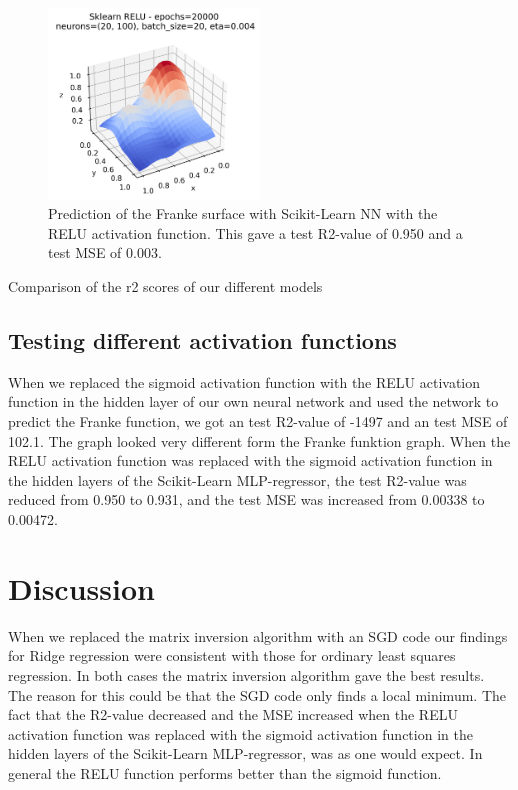 \documentclass[12pt,a4paper]{article}
\begin{document}
    \begin{figure}[H]
        \centering
        \includegraphics[width=0.5\textwidth]{figures/sklearn_relu.png}
        \caption{Prediction of the Franke surface with Scikit-Learn NN with the RELU activation function. This gave a test R2-value of 0.950 and a test MSE of 0.003.}
        \label{fig:nn_sklearn_surf3}
    \end{figure}
    
    \begin{table}[H]
        \centering
        \caption{Comparison of the r2 scores of our different models}
        \label{tab:ex2comapare}
    \end{table}


\subsection{Testing different activation functions}

When we replaced the sigmoid activation function with the RELU activation function in the hidden layer of our own neural network and used the network to predict the Franke function, we got an test R2-value of -1497 and an test MSE of 102.1. The graph looked very different form the Franke funktion graph. When the RELU activation function was replaced with the sigmoid activation function in the hidden layers of the Scikit-Learn MLP-regressor, the test R2-value was reduced from 0.950 to 0.931, and the test MSE was increased from 0.00338 to 0.00472.


\section{Discussion}
When we replaced the matrix inversion algorithm with an SGD code our findings for Ridge regression were consistent with those for ordinary least squares regression. In both cases the matrix inversion algorithm gave the best results. The reason for this could be that the SGD code only finds a local minimum.
The fact that the R2-value decreased and the MSE increased when the RELU activation function was replaced with the sigmoid activation function in the hidden layers of the Scikit-Learn MLP-regressor, was as one would expect. In general the RELU function performs better than the sigmoid function. 
\end{document}
